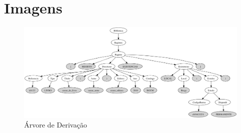 \documentclass[a4paper,11pt,openright,openbib]{article}
\begin{document}
\section{Imagens}
\label{ap:imagens}
\begin{figure}[!htb]
	\begin{center}
		\includegraphics[scale=.33,angle=-90,keepaspectratio]{../ficha5/g.png}
	\end{center}
	\caption{\label{parse_tree_ap}Árvore de Derivação}
\end{figure}
\end{document}
